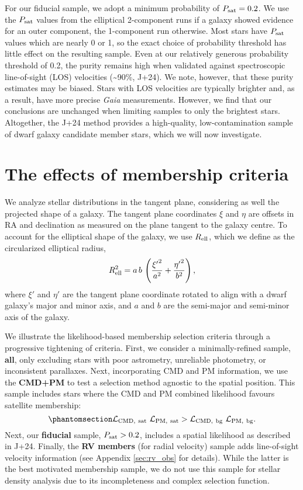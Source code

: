 For our fiducial sample, we adopt a minimum probability of
\(P_{\rm sat} = 0.2\). We use the \(P_{\rm sat}\) values from the
elliptical 2-component runs if a galaxy showed evidence for an outer
component, the 1-component run otherwise. Most stars have
\(P_{\rm  sat}\) values which are nearly 0 or 1, so the exact choice of
probability threshold has little effect on the resulting sample. Even at
our relatively generous probability threshold of 0.2, the purity remains
high when validated against spectroscopic line-of-sight (LOS) velocities
(\textasciitilde90\%, J+24). We note, however, that these purity
estimates may be biased. Stars with LOS velocities are typically
brighter and, as a result, have more precise \emph{Gaia} measurements.
However, we find that our conclusions are unchanged when limiting
samples to only the brightest stars. Altogether, the J+24 method
provides a high-quality, low-contamination sample of dwarf galaxy
candidate member stars, which we will now investigate.

\section{The effects of membership
criteria}\label{the-effects-of-membership-criteria}

We analyze stellar distributions in the tangent plane, considering as
well the projected shape of a galaxy. The tangent plane coordinates
\(\xi\) and \(\eta\) are offsets in RA and declination as measured on
the plane tangent to the galaxy centre. To account for the elliptical
shape of the galaxy, we use \(R_{\rm ell}\), which we define as the
circularized elliptical radius, \begin{equation}{
R_{\rm ell}^2 = a\,b\,\left(\frac{{\xi'}^2}{a^2} + \frac{{\eta'}^2}{b^2} \right),
}\end{equation} where \(\xi'\) and \(\eta'\) are the tangent plane
coordinate rotated to align with a dwarf galaxy's major and minor axis,
and \(a\) and \(b\) are the semi-major and semi-minor axis of the
galaxy.

We illustrate the likelihood-based membership selection criteria through
a progressive tightening of criteria. First, we consider a
minimally-refined sample, \textbf{all}, only excluding stars with poor
astrometry, unreliable photometry, or inconsistent parallaxes. Next,
incorporating CMD and PM information, we use the \textbf{CMD+PM} to test
a selection method agnostic to the spatial position. This sample
includes stars where the CMD and PM combined likelihood favours
satellite membership:
\begin{equation}\protect\phantomsection\label{eq:sel_cmd_pm}{
{\cal L}_{\rm CMD,\ sat}\ {\cal L}_{\rm PM,\ sat} > {\cal L}_{\rm CMD,\ bg}\ {\cal L}_{\rm PM,\ bg}.
}\end{equation} Next, our \textbf{fiducial} sample,
\(P_{\rm sat} > 0.2\), includes a spatial likelihood as described in
J+24. Finally, the \textbf{RV members} (for radial velocity) sample adds
line-of-sight velocity information (see Appendix \ref{sec:rv_obs} for
details). While the latter is the best motivated membership sample, we
do not use this sample for stellar density analysis due to its
incompleteness and complex selection function.

